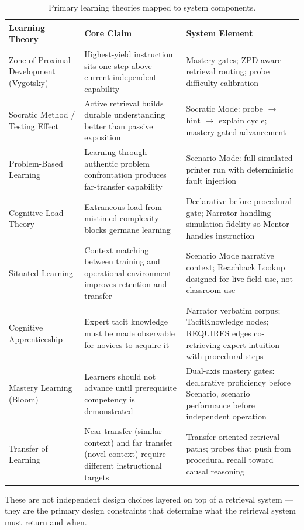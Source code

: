 \documentclass[10pt,letterpaper,twocolumn]{article}
\newcommand{\arrowto}{$\rightarrow$}
\begin{document}
\begin{table}[t]
\centering
\begin{tabularx}{\textwidth}{@{}l X X@{}}
\toprule
\textbf{Learning Theory} & \textbf{Core Claim} & \textbf{System Element} \\
\midrule
Zone of Proximal Development (Vygotsky) & Highest-yield instruction sits one step above current independent capability & Mastery gates; ZPD-aware retrieval routing; probe difficulty calibration \\
Socratic Method / Testing Effect & Active retrieval builds durable understanding better than passive exposition & Socratic Mode: probe \arrowto{} hint \arrowto{} explain cycle; mastery-gated advancement \\
Problem-Based Learning & Learning through authentic problem confrontation produces far-transfer capability & Scenario Mode: full simulated printer run with deterministic fault injection \\
Cognitive Load Theory & Extraneous load from mistimed complexity blocks germane learning & Declarative-before-procedural gate; Narrator handling simulation fidelity so Mentor handles instruction \\
Situated Learning & Context matching between training and operational environment improves retention and transfer & Scenario Mode narrative context; Reachback Lookup designed for live field use, not classroom use \\
Cognitive Apprenticeship & Expert tacit knowledge must be made observable for novices to acquire it & Narrator verbatim corpus; TacitKnowledge nodes; REQUIRES edges co-retrieving expert intuition with procedural steps \\
Mastery Learning (Bloom) & Learners should not advance until prerequisite competency is demonstrated & Dual-axis mastery gates: declarative proficiency before Scenario, scenario performance before independent operation \\
Transfer of Learning & Near transfer (similar context) and far transfer (novel context) require different instructional targets & Transfer-oriented retrieval paths; probes that push from procedural recall toward causal reasoning \\
\bottomrule
\end{tabularx}
\caption{Primary learning theories mapped to system components.}
\label{tab:learning-concepts}
\end{table}

These are not independent design choices layered on top of a retrieval system --- they are the primary design constraints that determine what the retrieval system must return and when.
\end{document}
